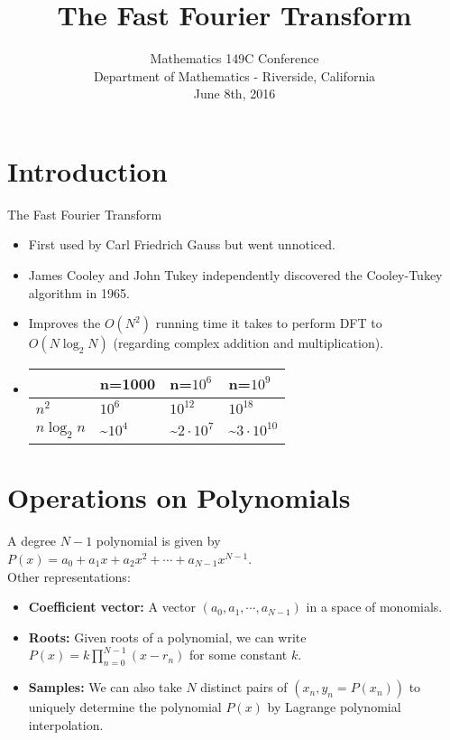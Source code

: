 \documentclass{beamer}
\title[] %
{The Fast Fourier Transform}
\author[] %
{}
\institute[] %
{
  \inst{1}%
	
  \and
  \inst{2}%
  
 }
\date[Mathematics 149C Conference] %
{Mathematics 149C Conference\\Department of Mathematics - Riverside, California\\June 8th, 2016}
\begin{document}




\section[intro]{Introduction} %

\begin{frame}
The Fast Fourier Transform
\begin{itemize}
\item First used by Carl Friedrich Gauss but went unnoticed.
\item James Cooley and John Tukey independently discovered the Cooley-Tukey algorithm in 1965.
\item Improves the $O(N^2)$ running time it takes to perform DFT to $O(N\log_2{N})$ (regarding complex addition and multiplication).
\item
\begin{tabular}{|p{1cm}|p{2cm}|p{2cm}|p{2cm}|}
\hline
&n=1000&n=$10^6$&n=$10^9$\\
\hline
$n^2$&$10^6$&$10^{12}$&$10^{18}$\\
\hline
$n\log_2{n}$&\textasciitilde$10^4$&\textasciitilde$2\cdot10^7$&\textasciitilde$3\cdot10^{10}$\\
\hline
\end{tabular}
\end{itemize}

\end{frame}

\section[Polynomials]{Operations on Polynomials}

\begin{frame}
A degree $N-1$ polynomial is given by $P(x) = a_0+a_1x+a_2x^2+\cdots+a_{N-1}x^{N-1}$.\\
\bigskip
\large{Other representations:}
\begin{itemize}
\item{\textbf{Coefficient vector:}} A vector $(a_0,a_1,\cdots,a_{N-1})$ in a space of monomials.
\item{\textbf{Roots:}} Given roots of a polynomial, we can write $P(x) = k\prod_{n=0}^{N-1}(x-r_n)$ for some constant $k$.
\item{\textbf{Samples:}} We can also take $N$ distinct pairs of $(x_n,y_n=P(x_n))$ to uniquely determine the polynomial $P(x)$ by Lagrange polynomial interpolation.
\end{itemize}
\end{frame}
\end{document}
